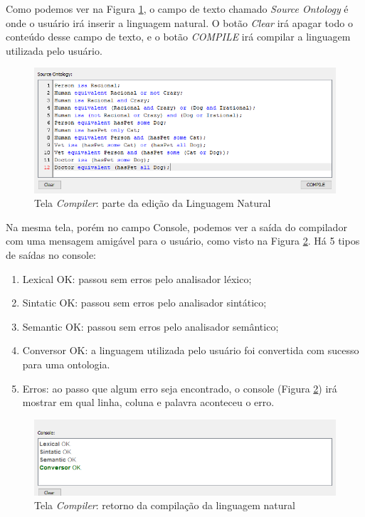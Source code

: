 \documentclass{bcc}
\begin{document}
Como podemos ver na Figura \ref{fig:telaCompiler1}, o campo de texto chamado \textit{Source Ontology} é onde o usuário irá inserir a linguagem natural. O botão \textit{Clear} irá apagar todo o conteúdo desse campo de texto, e o botão \textit{COMPILE} irá compilar a linguagem utilizada pelo usuário. 

\begin{figure}[H]
\centering
\includegraphics[width=.7\textwidth]{Figuras/tela_compiler1.png}
\caption{Tela \textit{Compiler}: parte da edição da Linguagem Natural}
\label{fig:telaCompiler1}
\end{figure}

Na mesma tela, porém no campo Console, podemos ver a saída do compilador com uma mensagem amigável para o usuário, como visto na Figura \ref{fig:telaCompiler2}. Há 5 tipos de saídas no console: 

\begin{enumerate}
  \item Lexical OK: passou sem erros pelo analisador léxico;
  \item Sintatic OK: passou sem erros pelo analisador sintático;
  \item Semantic OK: passou sem erros pelo analisador semântico;
  \item Conversor OK: a linguagem utilizada pelo usuário foi convertida com sucesso para uma ontologia.
  \item Erros: ao passo que algum erro seja encontrado, o console (Figura \ref{fig:telaCompiler2}) irá mostrar em qual linha, coluna e palavra aconteceu o erro.
\end{enumerate}

\begin{figure}[H]
\centering
\includegraphics[width=.7\textwidth]{Figuras/tela_compiler2.png}
\caption{Tela \textit{Compiler}: retorno da compilação da linguagem natural}
\label{fig:telaCompiler2}
\end{figure}
\end{document}

